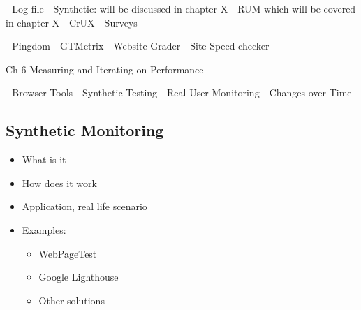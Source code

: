- Log file
- Synthetic: will be discussed in chapter X
- RUM which will be covered in chapter X
- CrUX
- Surveys


- Pingdom
- GTMetrix
- Website Grader
- Site Speed checker












Ch 6 Measuring and Iterating on Performance

- Browser Tools
- Synthetic Testing
- Real User Monitoring
- Changes over Time















\subsection{Synthetic Monitoring}

\begin{itemize}
    \item What is it
    \item How does it work
    \item Application, real life scenario
    \item Examples:
    \begin{itemize}
        \item WebPageTest
        \item Google Lighthouse
        \item Other solutions
    \end{itemize}
\end{itemize}













